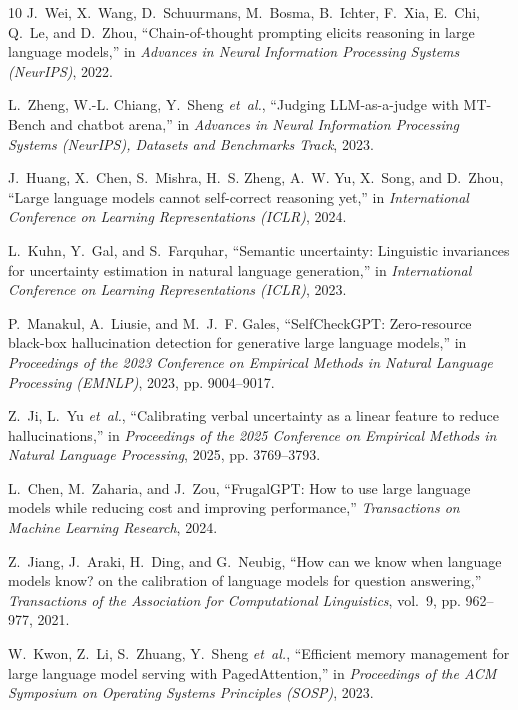 \documentclass[conference]{IEEEtran}
\begin{document}
\begin{thebibliography}{10}
J.~Wei, X.~Wang, D.~Schuurmans, M.~Bosma, B.~Ichter, F.~Xia, E.~Chi, Q.~Le, and
  D.~Zhou, ``Chain-of-thought prompting elicits reasoning in large language
  models,'' in \emph{Advances in Neural Information Processing Systems
  (NeurIPS)}, 2022.

L.~Zheng, W.-L. Chiang, Y.~Sheng \emph{et~al.}, ``Judging {LLM}-as-a-judge with
  {MT-Bench} and chatbot arena,'' in \emph{Advances in Neural Information
  Processing Systems (NeurIPS), Datasets and Benchmarks Track}, 2023.

J.~Huang, X.~Chen, S.~Mishra, H.~S. Zheng, A.~W. Yu, X.~Song, and D.~Zhou,
  ``Large language models cannot self-correct reasoning yet,'' in
  \emph{International Conference on Learning Representations (ICLR)}, 2024.

L.~Kuhn, Y.~Gal, and S.~Farquhar, ``Semantic uncertainty: Linguistic
  invariances for uncertainty estimation in natural language generation,'' in
  \emph{International Conference on Learning Representations (ICLR)}, 2023.

P.~Manakul, A.~Liusie, and M.~J.~F. Gales, ``{SelfCheckGPT}: Zero-resource
  black-box hallucination detection for generative large language models,'' in
  \emph{Proceedings of the 2023 Conference on Empirical Methods in Natural
  Language Processing (EMNLP)}, 2023, pp. 9004--9017.

Z.~Ji, L.~Yu \emph{et~al.}, ``Calibrating verbal uncertainty as a linear
  feature to reduce hallucinations,'' in \emph{Proceedings of the 2025
  Conference on Empirical Methods in Natural Language Processing}, 2025, pp.
  3769--3793.

L.~Chen, M.~Zaharia, and J.~Zou, ``{FrugalGPT}: How to use large language
  models while reducing cost and improving performance,'' \emph{Transactions on
  Machine Learning Research}, 2024.

Z.~Jiang, J.~Araki, H.~Ding, and G.~Neubig, ``How can we know when language
  models know? on the calibration of language models for question answering,''
  \emph{Transactions of the Association for Computational Linguistics}, vol.~9,
  pp. 962--977, 2021.

W.~Kwon, Z.~Li, S.~Zhuang, Y.~Sheng \emph{et~al.}, ``Efficient memory
  management for large language model serving with {PagedAttention},'' in
  \emph{Proceedings of the ACM Symposium on Operating Systems Principles
  (SOSP)}, 2023.

\end{thebibliography}
\end{document}
